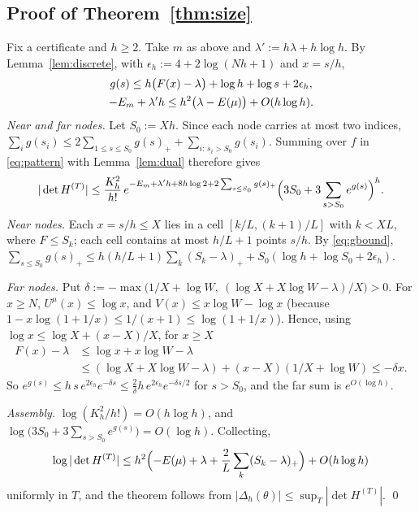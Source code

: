 \documentclass[11pt]{amsart}
\theoremstyle{definition}
\theoremstyle{remark}
\numberwithin{equation}{section}
\begin{document}
\subsection{Proof of Theorem~\ref{thm:size}}
Fix a certificate and $h\ge2$. Take $m$ as above and $\lambda':=h\lambda+h\log h$. By Lemma~\ref{lem:discrete}, with
$\epsilon_h:=4+2\log(Nh+1)$ and $x=s/h$,
\begin{gather}
  g(s)\le h\bigl(F(x)-\lambda\bigr)+\log h+\log s+2\epsilon_h,\label{eq:gbound}\\
  -E_m+\lambda'h\le h^2\bigl(\lambda-E(\mu)\bigr)+O(h\log h).\notag
\end{gather}
\emph{Near and far nodes.} Let $S_0:=Xh$. Since each node carries at most two indices,
$\sum_ig(s_i)\le2\sum_{1\le s\le S_0}g(s)_++\sum_{i:\,s_i>S_0}g(s_i)$. Summing over $f$ in \eqref{eq:pattern} with
Lemma~\ref{lem:dual} therefore gives
\[
  |\det H^{(T)}|\le\frac{K_h^2}{h!}\,e^{-E_m+\lambda'h+8h\log2+2\sum_{s\le S_0}g(s)_+}\Bigl(3S_0+3\sum_{s>S_0}e^{g(s)}\Bigr)^h .
\]
\emph{Near nodes.} Each $x=s/h\le X$ lies in a cell $[k/L,(k+1)/L]$ with $k<XL$, where $F\le S_k$; each cell contains at
most $h/L+1$ points $s/h$. By \eqref{eq:gbound},
$\sum_{s\le S_0}g(s)_+\le h(h/L+1)\sum_k(S_k-\lambda)_++S_0(\log h+\log S_0+2\epsilon_h)$.

\emph{Far nodes.} Put $\delta:=-\max\bigl(1/X+\log W,\ (\log X+X\log W-\lambda)/X\bigr)>0$. For $x\ge N$,
$U^\mu(x)\le\log x$, and $V(x)\le x\log W-\log x$ (because $1-x\log(1+1/x)\le1/(x+1)\le\log(1+1/x)$). Hence, using
$\log x\le\log X+(x-X)/X$, for $x\ge X$
\begin{align*}
  F(x)-\lambda&\le\log x+x\log W-\lambda\\
  &\le(\log X+X\log W-\lambda)+(x-X)(1/X+\log W)\le-\delta x .
\end{align*}
So $e^{g(s)}\le h\,s\,e^{2\epsilon_h}e^{-\delta s}\le\frac2\delta h\,e^{2\epsilon_h}e^{-\delta s/2}$ for $s>S_0$, and the
far sum is $e^{O(\log h)}$.

\emph{Assembly.} $\log(K_h^2/h!)=O(h\log h)$, and $\log\bigl(3S_0+3\sum_{s>S_0}e^{g(s)}\bigr)=O(\log h)$. Collecting,
\[
  \log|\det H^{(T)}|\le h^2\Bigl(-E(\mu)+\lambda+\frac2L\sum_k(S_k-\lambda)_+\Bigr)+O(h\log h)
\]
uniformly in $T$, and the theorem follows from $|\Delta_h(\theta)|\le\sup_T|\det H^{(T)}|$. \qed
\end{document}
